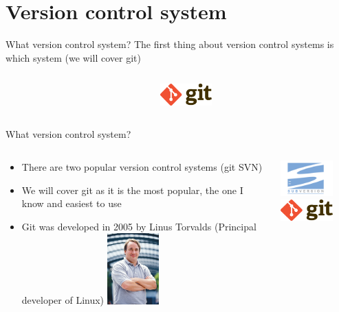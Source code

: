 \documentclass[10pt]{beamer}
\begin{document}
\section{Version control system}


\begin{frame}[fragile]{What version control system?}
The first thing about version control systems is which system (we will cover git) \\
\begin{columns}[T]
\begin{column}{.8\textwidth}
\end{column}
\begin{column}{.2\textwidth}
\includegraphics[width=2cm]{Figs/Git-logo}
\end{column}
\end{columns}
\end{frame}


\begin{frame}[fragile]{What version control system?}
\begin{columns}[T]
\begin{column}{.8\textwidth}
\begin{itemize}
\item There are two popular version control systems (git SVN)
\item We will cover git as it is the most popular, the one I know and easiest to use
\item Git was developed in 2005 by Linus Torvalds (Principal developer of Linux)
\includegraphics[width=2cm]{Figs/Linus_Torvalds}
\end{itemize}
\end{column}
\begin{column}{.2\textwidth}
\includegraphics[width=2cm]{Figs/SVN} \newline \newline
\includegraphics[width=2cm]{Figs/Git-logo}
\end{column}
\end{columns}
\end{frame}
\end{document}
